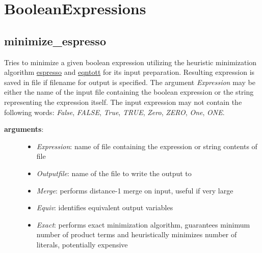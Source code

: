 \documentclass[letterpaper,10pt,english]{sphinxmanual}
\begin{document}
\section{BooleanExpressions}
\label{BooleanExpressions:id1}\label{BooleanExpressions::doc}\label{BooleanExpressions:booleanexpressions}

\subsection{minimize\_espresso}
\label{BooleanExpressions:minimize-espresso}\label{BooleanExpressions:id2}

\begin{fulllineitems}
\label{BooleanExpressions:PyBoolNet.BooleanExpressions.minimize_espresso}
Tries to minimize a given boolean expression utilizing the heuristic minimization algorithm
\href{http://chmod755.tumblr.com/post/31417234230/espresso-heuristic-logic-minimizer}{espresso} and \href{https://code.google.com/archive/p/eqntott/}{eqntott} for its input preparation. Resulting expression is saved
in file if filename for output is specified. The argument \emph{Expression} may be either the name
of the input file containing the boolean expression or the string representing the expression
itself. The input expression may not contain the following words: \emph{False}, \emph{FALSE}, \emph{True},
\emph{TRUE}, \emph{Zero}, \emph{ZERO}, \emph{One}, \emph{ONE}.
\begin{description}
\item[{\textbf{arguments}:}] \leavevmode\begin{itemize}
\item {} 
\emph{Expression}: name of file containing the expression or string contents of file

\item {} 
\emph{Outputfile}: name of the file to write the output to

\item {} 
\emph{Merge}: performs distance-1 merge on input, useful if very large

\item {} 
\emph{Equiv}: identifies equivalent output variables

\item {} 
\emph{Exact}: performs exact minimization algorithm, guarantees minimum number of product terms and heuristically minimizes number of literals, potentially expensive


\end{itemize}
\end{description}
\end{fulllineitems}
\end{document}
